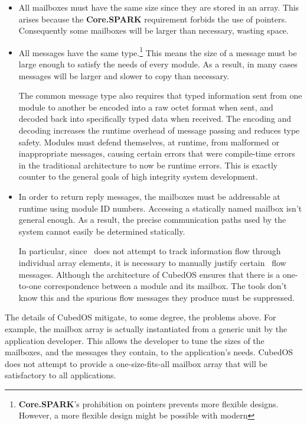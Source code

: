\begin{itemize}
\item All mailboxes must have the same size since they are stored in an array. This arises
  because the \textbf{Core.SPARK} requirement forbids the use of pointers. Consequently some
  mailboxes will be larger than necessary, wasting space. 

\item All messages have the same type.\footnote{\textbf{Core.SPARK}'s prohibition on pointers
    prevents more flexible designs. However, a more flexible design might be possible with
    modern \SPARK} This means the size of a message must be large enough to satisfy the needs of
  every module. As a result, in many cases messages will be larger and slower to copy than
  necessary.

  The common message type also requires that typed information sent from one module to another
  be encoded into a raw octet format when sent, and decoded back into specifically typed data
  when received. The encoding and decoding increases the runtime overhead of message passing and
  reduces type safety. Modules must defend themselves, at runtime, from malformed or
  inappropriate messages, causing certain errors that were compile-time errors in the
  traditional architecture to now be runtime errors. This is exactly counter to the general
  goals of high integrity system development.

\item In order to return reply messages, the mailboxes must be addressable at runtime using
  module ID numbers. Accessing a statically named mailbox isn't general enough. As a result, the
  precise communication paths used by the system cannot easily be determined statically.

  In particular, since \SPARK\ does not attempt to track information flow through individual
  array elements, it is necessary to manually justify certain \SPARK\ flow messages.  Although the architecture of CubedOS ensures that there
  is a one-to-one correspondence between a module and its mailbox. The tools don't know this and
  the spurious flow messages they produce must be suppressed.
\end{itemize}

The details of CubedOS mitigate, to some degree, the problems above. For example, the mailbox
array is actually instantiated from a generic unit by the application developer. This allows the
developer to tune the sizes of the mailboxes, and the messages they contain, to the
application's needs. CubedOS does not attempt to provide a one-size-fits-all mailbox array that
will be satisfactory to all applications.

